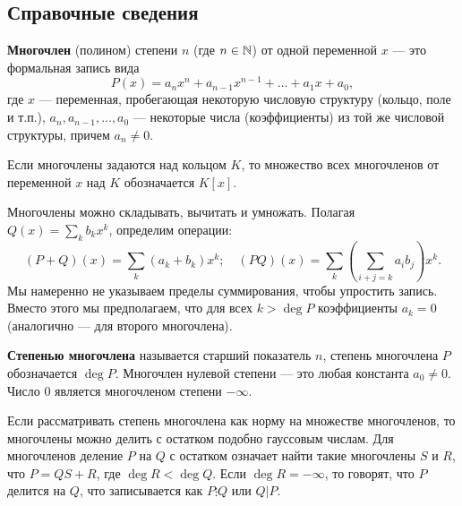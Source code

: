 \setcounter{chapter}{50}

\subsection*{Справочные сведения}

\textbf{Многочлен} (полином) степени $n$ (где $n\in\mathbb N$) от одной переменной $x$ --- это формальная запись вида
$$
P(x) = a_nx^n+a_{n-1}x^{n-1}+\dots+a_1x+a_0,
$$
где $x$ --- переменная, пробегающая некоторую числовую структуру (кольцо, поле и т.п.), $a_n,a_{n-1},\dots,a_0$ --- некоторые числа (коэффициенты) из той же числовой структуры, причем $a_n\ne 0$.

Если многочлены задаются над кольцом $K$, то множество всех многочленов от переменной $x$ над $K$ обозначается $K[x]$.

Многочлены можно складывать, вычитать и умножать. Полагая $Q(x)=\sum_k b_kx^k$, определим операции:
$$
(P+Q)(x)=\sum_k(a_k+b_k)x^k;\quad (PQ)(x)=\sum_k\left(\sum_{i+j=k}a_ib_j\right)x^k.
$$
Мы намеренно не указываем пределы суммирования, чтобы упростить запись. Вместо этого мы предполагаем, что для всех $k>\deg P$ коэффициенты $a_k=0$ (аналогично --- для второго многочлена).

\textbf{Степенью многочлена} называется старший показатель $n$, степень многочлена $P$ обозначается $\deg P$. Многочлен нулевой степени --- это любая константа $a_0\ne 0$. Число 0 является многочленом степени $-\infty$.

Если рассматривать степень многочлена как норму на множестве многочленов, то многочлены можно делить с остатком подобно гауссовым числам. Для многочленов деление $P$ на $Q$ с остатком означает найти такие многочлены $S$ и $R$, что $P=QS+R$, где $\deg R<\deg Q$. Если $\deg R=-\infty$, то говорят, что $P$ делится на $Q$, что записывается как $P\vdots Q$ или $Q|P$.

